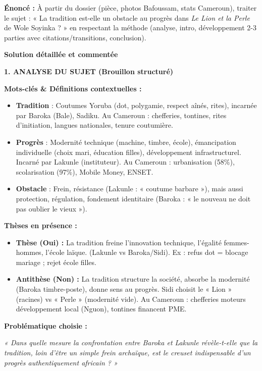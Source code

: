\documentclass[11pt]{article}
\newcounter{popsec}
\newcounter{popsub}
\newcommand{\courssub}[1]{%
  \stepcounter{popsub}%
  \par\vspace{9pt}\noindent{\popxbold\fontsize{11.5}{13}\selectfont\color{popink}{\color{poporange}\thepopsec.\thepopsub}\hspace{6pt}#1}\par\nopagebreak\vspace{4pt}
}
\begin{document}
\courssub{Démarche et corrigé commenté}
\begin{exoresolu}
\textbf{Énoncé :} À partir du dossier (pièce, photos Bafoussam, stats Cameroun), traiter le sujet : « La tradition est-elle un obstacle au progrès dans \emph{Le Lion et la Perle} de Wole Soyinka ? » en respectant la méthode (analyse, intro, développement 2-3 parties avec citations/transitions, conclusion).

\tcblower
\textbf{Solution détaillée et commentée}

\medskip
\noindent \textbf{1. ANALYSE DU SUJET (Brouillon structuré)}

\noindent \textbf{Mots-clés \& Définitions contextuelles :}
\begin{itemize}
    \item \textbf{Tradition} : Coutumes Yoruba (dot, polygamie, respect aînés, rites), incarnée par Baroka (Bale), Sadiku. Au Cameroun : chefferies, tontines, rites d'initiation, langues nationales, tenure coutumière.
    \item \textbf{Progrès} : Modernité technique (machine, timbre, école), émancipation individuelle (choix mari, éducation filles), développement infrastructurel. Incarné par Lakunle (instituteur). Au Cameroun : urbanisation (58\%), scolarisation (97\%), Mobile Money, ENSET.
    \item \textbf{Obstacle} : Frein, résistance (Lakunle : « coutume barbare »), mais aussi protection, régulation, fondement identitaire (Baroka : « le nouveau ne doit pas oublier le vieux »).
\end{itemize}

\noindent \textbf{Thèses en présence :}
\begin{itemize}
    \item \textbf{Thèse (Oui) :} La tradition freine l'innovation technique, l'égalité femmes-hommes, l'école laïque. (Lakunle vs Baroka/Sidi). Ex : refus dot = blocage mariage ; rejet école filles.
    \item \textbf{Antithèse (Non) :} La tradition structure la société, absorbe la modernité (Baroka timbre-poste), donne sens au progrès. Sidi choisit le « Lion » (racines) vs « Perle » (modernité vide). Au Cameroun : chefferies moteurs développement local (Nguon), tontines financent PME.
\end{itemize}

\noindent \textbf{Problématique choisie :}
\begin{center}
    \emph{« Dans quelle mesure la confrontation entre Baroka et Lakunle révèle-t-elle que la tradition, loin d'être un simple frein archaïque, est le creuset indispensable d'un progrès authentiquement africain ? »}
\end{center}


\end{exoresolu}
\end{document}
